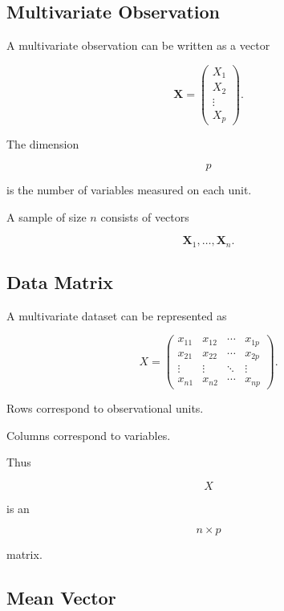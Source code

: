 \subsection{Multivariate Observation}
\label{subsec:multivariate-observation}

A multivariate observation can be written as a vector

\[
\boxed{
\mathbf{X}
=
\begin{pmatrix}
X_1\\
X_2\\
\vdots\\
X_p
\end{pmatrix}.
}
\]

The dimension

\[
p
\]

is the number of variables measured on each unit.

A sample of size \(n\) consists of vectors

\[
\boxed{
\mathbf{X}_1,
\ldots,
\mathbf{X}_n.
}
\]

\subsection{Data Matrix}
\label{subsec:multivariate-data-matrix}

A multivariate dataset can be represented as

\[
\boxed{
X
=
\begin{pmatrix}
x_{11} & x_{12} & \cdots & x_{1p}\\
x_{21} & x_{22} & \cdots & x_{2p}\\
\vdots & \vdots & \ddots & \vdots\\
x_{n1} & x_{n2} & \cdots & x_{np}
\end{pmatrix}.
}
\]

Rows correspond to observational units.

Columns correspond to variables.

Thus

\[
X
\]

is an

\[
\boxed{
n\times p
}
\]

matrix.

\subsection{Mean Vector}
\label{subsec:population-mean-vector}

